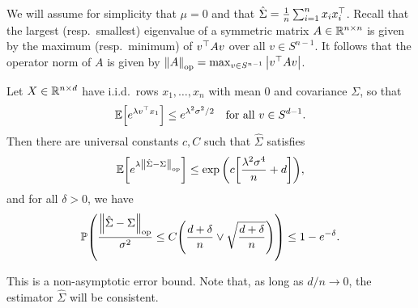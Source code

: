 We will assume for simplicity that $\mu = 0$ and that $\hat\Sigma = \frac1n \sum_{i=1}^n x_i x_i^\top$.  Recall that the largest (resp.\ smallest) eigenvalue of a symmetric matrix $A \in \mathbb R^{n\times n}$ is given by the maximum (resp.\ minimum) of $v^\top A v$ over all $v \in S^{n-1}$. It follows that the operator norm of $A$ is given by $\norm{A}_\mathrm{op} = \max_{v \in S^{n-1}} \abs{v^\top A v}$. 

\begin{theorem}
	Let $X \in \mathbb R^{n\times d}$ have i.i.d.\ rows $x_1, \dotsc, x_n$ with mean 0 and covariance $\Sigma$, so that 
	\[
	\mathbb E\qty[ e^{\lambda v^\top x_1}] \leq e^{\lambda^2\sigma^2/2} \quad\text{for all $v \in S^{d-1}$}. 
	\]
	Then there are universal constants $c, C$ such that $\hat\Sigma$ satisfies 
	\[
	\mathbb E\qty[e^{\lambda\norm{\hat\Sigma - \Sigma}_\mathrm{op}}] \leq \exp\qty(c \qty[ \frac{\lambda^2\sigma^4}{n} + d]),
	\]
	and for all $\delta > 0$, we have
	\[
	\mathbb P\qty(\frac{\norm{\hat\Sigma - \Sigma}_\mathrm{op}}{\sigma^2} \leq C \qty(\frac{d + \delta}{n} \lor \sqrt{\frac{d + \delta}{n}})) \leq 1 - e^{-\delta}. 
	\]
\end{theorem}

This is a non-asymptotic error bound. Note that, as long as $d/n \to 0$, the estimator $\hat\Sigma$ will be consistent. 